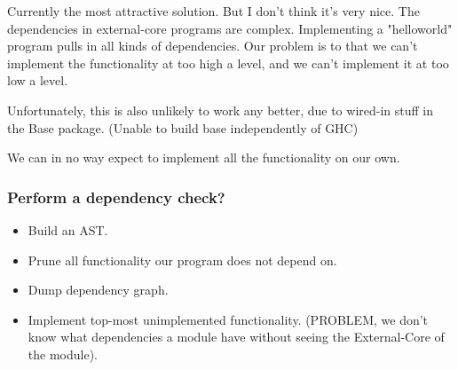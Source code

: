 Currently the most attractive solution. But I don't think it's very nice.
The dependencies in external-core programs are complex. Implementing a
"helloworld" program pulls in all kinds of dependencies. Our problem is to 
that we can't implement the functionality at too high a level, and we can't
implement it at too low a level.

Unfortunately, this is also unlikely to work any better, due to wired-in stuff in the
Base package. (Unable to build base independently of GHC)

We can in no way expect to implement all the functionality on our own.

\subsubsection{Perform a dependency check?}

\begin{itemize}
\item Build an AST. 
\item Prune all functionality our program does not depend on.
\item Dump dependency graph.
\item Implement top-most unimplemented functionality. (PROBLEM, we don't know what dependencies a module have without seeing the External-Core of the module).
\end{itemize}
